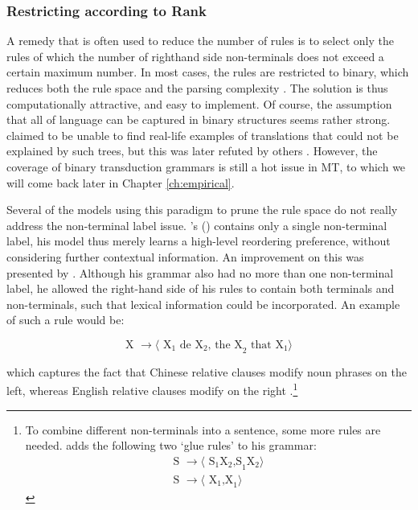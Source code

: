 \documentclass{report}
\theoremstyle{definition}
\theoremstyle{plain}
\def\citepos#1{\citeauthor{#1}'s (\citeyear{#1})}
\begin{document}
\subsubsection{Restricting according to Rank}

A remedy that is often used to reduce the number of rules is to select only the rules of which the number of righthand side non-terminals does not exceed a certain maximum number. In most cases, the rules are restricted to binary, which reduces both the rule space and the parsing complexity \citep[e.g,][]{wu1997stochastic,chiang2005hierarchical,mylonakis2011learning}. The solution is thus computationally attractive, and easy to implement. Of course, the assumption that all of language can be captured in binary structures seems rather strong. \citeauthor{wu1997stochastic} claimed to be unable to find real-life examples of translations that could not be explained by such trees, but this was later refuted by others \citep[e.g.,][]{galley2004s}. However, the coverage of binary transduction grammars is still a hot issue in MT, to which we will come back later in Chapter \ref{ch:empirical}. 

Several of the models using this paradigm to prune the rule space do not really address the non-terminal label issue. \citepos{wu1995algorithm} contains only a single non-terminal label, his model thus merely learns a high-level reordering preference, without considering further contextual information. An improvement on this was presented by \cite{chiang2005hierarchical,chiang2007hierarchical}. Although his grammar also had no more than one non-terminal label, he allowed the right-hand side of his rules to contain both terminals and non-terminals, such that lexical information could be incorporated. An example of such a rule would be:

\[
\text{X } \rightarrow \langle\text{ X}_1 \text{ de X}_2 \text{, the X}_2 \text{ that X}_1\rangle
\]

which captures the fact that Chinese relative clauses modify noun phrases on the left, whereas English relative clauses modify on the right \citep{chiang2007hierarchical}.\footnote{To combine different non-terminals into a sentence, some more rules are needed. \cite{chiang2007hierarchical} adds the following two `glue rules' to his grammar:\begin{align*}
 \text{S } \rightarrow \langle\text{ S}_1\text{X}_2 \text{,S}_1\text{X}_2\rangle\\
\text{S } \rightarrow \langle\text{ X}_1 \text{,X}_1\rangle 
\end{align*}

}
\end{document}
